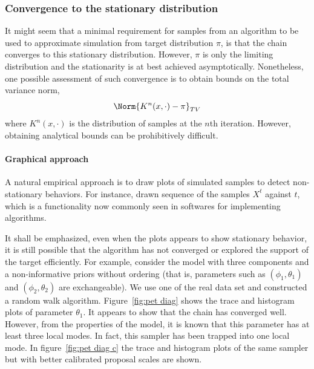 \subsubsection{Convergence to the stationary distribution}
\label{ssub:Convergence to the stationary distribution}

It might seem that a minimal requirement for samples from an \mcmc algorithm
to be used to approximate simulation from target distribution $\pi$, is that
the chain converges to this stationary distribution. However, $\pi$ is only
the limiting distribution and the stationarity is at best achieved
asymptotically. Nonetheless, one possible assessment of such convergence is to
obtain bounds on the total variance norm,
\begin{equation*}
  \Norm{K^n(x,\cdot)-\pi}_{TV}
\end{equation*}
where $K^n(x,\cdot)$ is the distribution of samples at the $n$th iteration.
However, obtaining analytical bounds can be prohibitively difficult.

\paragraph{Graphical approach}

A natural empirical approach is to draw plots of simulated samples to detect
non-stationary behaviors. For instance, \cite{Gelfand:1990it} drawn sequence
of the samples $X^t$ against $t$, which is a functionality now commonly seen
in softwares for implementing \mcmc algorithms.

It shall be emphasized, even when the plots appears to show stationary
behavior, it is still possible that the algorithm has not converged or
explored the support of the target efficiently. For example, consider the \pet
model with three components and a non-informative priors without ordering
(that is, parameters such as $(\phi_1,\theta_1)$ and $(\phi_2,\theta_2)$ are
exchangeable). We use one of the real data set and constructed a random walk
algorithm. Figure~\ref{fig:pet diag} shows the trace and histogram plots of
parameter $\theta_1$. It appears to show that the \mcmc chain has converged
well. However, from the properties of the model, it is known that this
parameter has at least three local modes. In fact, this sampler has been
trapped into one local mode. In figure~\ref{fig:pet diag c} the trace and
histogram plots of the same sampler but with better calibrated proposal
scales are shown.

